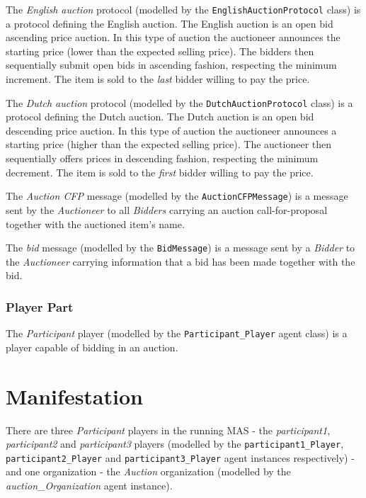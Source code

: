 The \textit{English auction} protocol (modelled by the \texttt{EnglishAuctionProtocol} class) is a protocol defining the English auction. 
The English auction is an open bid ascending price auction.
In this type of auction the auctioneer announces the starting price (lower than the expected selling price).
The bidders then sequentially submit open bids in ascending fashion, respecting the minimum increment.
The item is sold to the \textit{last} bidder willing to pay the price.

The \textit{Dutch auction} protocol (modelled by the \texttt{DutchAuctionProtocol} class) is a protocol defining the Dutch auction.
The Dutch auction is an open bid descending price auction.
In this type of auction the auctioneer announces a starting price (higher than the expected selling price).
The auctioneer then sequentially offers prices in descending fashion, respecting the minimum decrement.
The item is sold to the \textit{first} bidder willing to pay the price.

The \textit{Auction CFP} message (modelled by the \texttt{AuctionCFPMessage}) is a message sent by the \textit{Auctioneer} to all \textit{Bidders} carrying an auction call-for-proposal together with the auctioned item's name.

The \textit{bid} message (modelled by the \texttt{BidMessage}) is a message sent by a \textit{Bidder} to the \textit{Auctioneer} carrying information that a bid has been made together with the bid.

\subsubsection*{Player Part}

The \textit{Participant} player (modelled by the \texttt{Participant\_Player} agent class) is a player capable of bidding in an auction.

\section{Manifestation}

There are three \textit{Participant} players in the running MAS - the  \textit{participant1}, \textit{participant2} and \textit{participant3} players (modelled by the \texttt{participant1\_Player}, \texttt{participant2\_Player} and \texttt{participant3\_Player} agent instances respectively) - and one organization - the \textit{Auction} organization (modelled by the \textit{auction\_Organization} agent instance).

